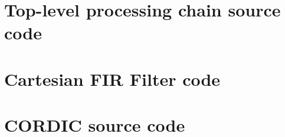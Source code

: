 \documentclass[11pt]{report}
\begin{document}
\begin{appendices}
    \chapter{Top-level processing chain source code}
        \begin{singlespace}
            
        \end{singlespace}

        \begin{singlespace}
            
        \end{singlespace}

	\chapter{Cartesian FIR Filter code}
        \begin{singlespace}
            
        \end{singlespace}

        \begin{singlespace}
            
        \end{singlespace}
        
    \chapter{CORDIC source code}
        \begin{singlespace}
            
        \end{singlespace}   
        

\end{appendices}
\end{document}
